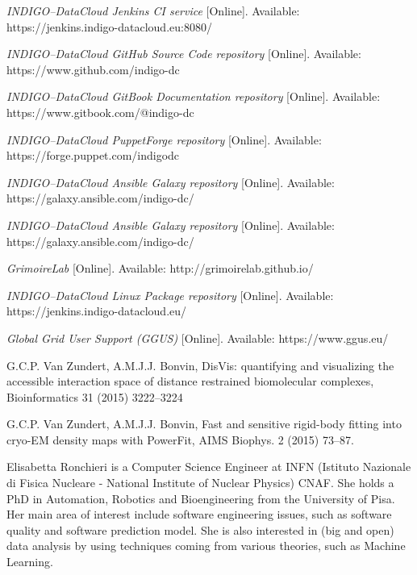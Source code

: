 \documentclass[journal]{IEEEtran}
\begin{document}
\begin{thebibliography}{1}
\emph{INDIGO--DataCloud Jenkins CI service} [Online]. Available:
https://jenkins.indigo-datacloud.eu:8080/

\emph{INDIGO--DataCloud GitHub Source Code repository} [Online]. Available:
https://www.github.com/indigo-dc

\emph{INDIGO--DataCloud GitBook Documentation repository} [Online]. Available:
https://www.gitbook.com/@indigo-dc

\emph{INDIGO--DataCloud PuppetForge repository} [Online]. Available:
https://forge.puppet.com/indigodc

\emph{INDIGO--DataCloud Ansible Galaxy repository} [Online]. Available:
https://galaxy.ansible.com/indigo-dc/

\emph{INDIGO--DataCloud Ansible Galaxy repository} [Online]. Available:
https://galaxy.ansible.com/indigo-dc/

\emph{GrimoireLab} [Online]. Available: http://grimoirelab.github.io/

\emph{INDIGO--DataCloud Linux Package repository} [Online]. Available: https://jenkins.indigo-datacloud.eu/

\emph{Global Grid User Support (GGUS)} [Online]. Available: https://www.ggus.eu/

 G.C.P. Van Zundert, A.M.J.J. Bonvin,
DisVis: quantifying and visualizing the accessible interaction space of distance
restrained biomolecular complexes, Bioinformatics 31 (2015) 3222--3224

 G.C.P. Van Zundert, A.M.J.J. Bonvin,
Fast and sensitive rigid-body fitting into cryo-EM density maps with PowerFit,
AIMS Biophys. 2 (2015) 73--87.

\end{thebibliography}

\begin{IEEEbiography} {Elisabetta Ronchieri}
is a Computer Science Engineer at INFN (Istituto Nazionale di Fisica Nucleare - National Institute of Nuclear Physics) CNAF. She holds a PhD in Automation, Robotics and Bioengineering from the University of Pisa. Her main area of interest include software engineering issues, such as software quality and software prediction model. She is also interested in (big and open) data analysis by using techniques coming from various theories, such as Machine Learning.
\end{IEEEbiography}
\end{document}
